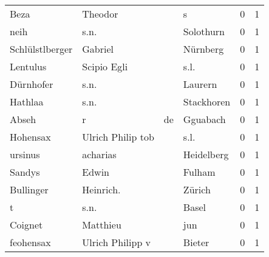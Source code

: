 \begin{center}
\begin{tiny}
\begin{longtabu}{llllrr}
                     Beza &                            Theodor &             &                                           s &          0 &         1 \\
                     neih &                               s.n. &             &                                   Solothurn &          0 &         1 \\
          Schlülstlberger &                            Gabriel &             &                                    Nürnberg &          0 &         1 \\
                 Lentulus &                        Scipio Egli &             &                                        s.l. &          0 &         1 \\
                Dürnhofer &                               s.n. &             &                                     Laurern &          0 &         1 \\
                  Hathlaa &                               s.n. &             &                                  Stackhoren &          0 &         1 \\
                    Abseh &                                  r &          de &                                    Gguabach &          0 &         1 \\
                 Hohensax &                  Ulrich Philip tob &             &                                        s.l. &          0 &         1 \\
                  ursinus &                           acharias &             &                                  Heidelberg &          0 &         1 \\
                   Sandys &                              Edwin &             &                                      Fulham &          0 &         1 \\
                Bullinger &                          Heinrich. &             &                                      Zürich &          0 &         1 \\
                        t &                               s.n. &             &                                       Basel &          0 &         1 \\
                  Coignet &                           Matthieu &             &                                         jun &          0 &         1 \\
                feohensax &                   Ulrich Philipp v &             &                                      Bieter &          0 &         1 \\

\end{longtabu}
\end{tiny}
\end{center}
